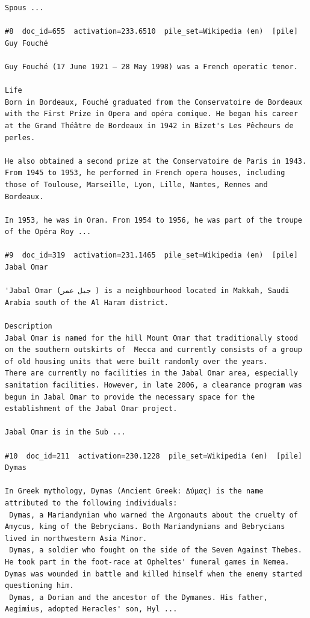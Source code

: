 \begin{verbatim}
Spous ...

#8  doc_id=655  activation=233.6510  pile_set=Wikipedia (en)  [pile]
Guy Fouché

Guy Fouché (17 June 1921 – 28 May 1998) was a French operatic tenor.

Life 
Born in Bordeaux, Fouché graduated from the Conservatoire de Bordeaux with the First Prize in Opera and opéra comique. He began his career at the Grand Théâtre de Bordeaux in 1942 in Bizet's Les Pêcheurs de perles.

He also obtained a second prize at the Conservatoire de Paris in 1943. From 1945 to 1953, he performed in French opera houses, including those of Toulouse, Marseille, Lyon, Lille, Nantes, Rennes and Bordeaux.

In 1953, he was in Oran. From 1954 to 1956, he was part of the troupe of the Opéra Roy ...

#9  doc_id=319  activation=231.1465  pile_set=Wikipedia (en)  [pile]
Jabal Omar

'Jabal Omar (جبل عمر ) is a neighbourhood located in Makkah, Saudi Arabia south of the Al Haram district.

Description 
Jabal Omar is named for the hill Mount Omar that traditionally stood on the southern outskirts of  Mecca and currently consists of a group of old housing units that were built randomly over the years. 
There are currently no facilities in the Jabal Omar area, especially sanitation facilities. However, in late 2006, a clearance program was begun in Jabal Omar to provide the necessary space for the establishment of the Jabal Omar project. 

Jabal Omar is in the Sub ...

#10  doc_id=211  activation=230.1228  pile_set=Wikipedia (en)  [pile]
Dymas

In Greek mythology, Dymas (Ancient Greek: Δύμας) is the name attributed to the following individuals:
 Dymas, a Mariandynian who warned the Argonauts about the cruelty of Amycus, king of the Bebrycians. Both Mariandynians and Bebrycians lived in northwestern Asia Minor.
 Dymas, a soldier who fought on the side of the Seven Against Thebes. He took part in the foot-race at Opheltes' funeral games in Nemea. Dymas was wounded in battle and killed himself when the enemy started questioning him.
 Dymas, a Dorian and the ancestor of the Dymanes. His father, Aegimius, adopted Heracles' son, Hyl ...

\end{verbatim}


